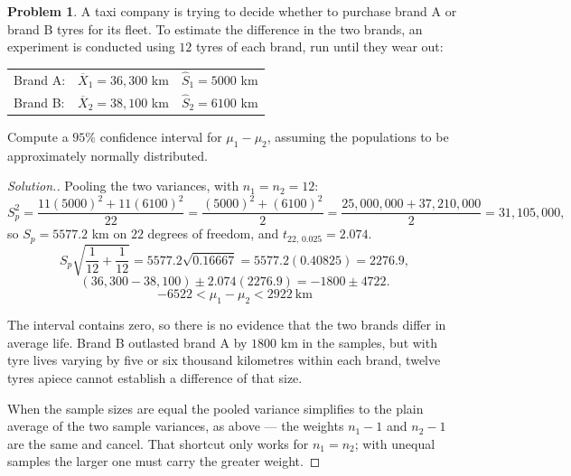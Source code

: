\documentclass[11pt,a4paper]{article}
\theoremstyle{definition}
\newtheorem{problemx}{Problem}[section]
\newenvironment{problem}{\begin{problemx}}{\end{problemx}}
\newenvironment{solution}
  {\renewcommand{\qedsymbol}{}\begin{proof}[\textit{Solution}.]}
  {\end{proof}}
\begin{document}
\begin{problem}
A taxi company is trying to decide whether to purchase brand A or brand B tyres for its
fleet. To estimate the difference in the two brands, an experiment is conducted using $12$
tyres of each brand, run until they wear out:
\begin{table}[H]
\centering
\begin{tabular}{lll}
Brand A: & $\overline{X}_1=36{,}300$ km & $\hat{S}_1=5000$ km\\
Brand B: & $\overline{X}_2=38{,}100$ km & $\hat{S}_2=6100$ km\\
\end{tabular}
\end{table}
Compute a $95\%$ confidence interval for $\mu_1-\mu_2$, assuming the populations to be
approximately normally distributed.
\end{problem}

\begin{solution}
Pooling the two variances, with $n_1=n_2=12$:
\[S_p^2=\frac{11(5000)^2+11(6100)^2}{22}=\frac{(5000)^2+(6100)^2}{2}
=\frac{25{,}000{,}000+37{,}210{,}000}{2}=31{,}105{,}000,\]
so $S_p=5577.2$ km on $22$ degrees of freedom, and $t_{22,\,0.025}=2.074$.
\[S_p\sqrt{\frac{1}{12}+\frac{1}{12}}=5577.2\sqrt{0.16667}=5577.2(0.40825)=2276.9,\]
\[(36{,}300-38{,}100)\pm 2.074(2276.9)=-1800\pm 4722.\]
\[-6522<\mu_1-\mu_2<2922\ \text{km}\]

The interval contains zero, so there is no evidence that the two brands differ in average
life. Brand B outlasted brand A by $1800$ km in the samples, but with tyre lives varying by
five or six thousand kilometres within each brand, twelve tyres apiece cannot establish a
difference of that size.

When the sample sizes are equal the pooled variance simplifies to the plain average of the
two sample variances, as above --- the weights $n_1-1$ and $n_2-1$ are the same and cancel.
That shortcut only works for $n_1=n_2$; with unequal samples the larger one must carry the
greater weight.
\end{solution}
\end{document}
